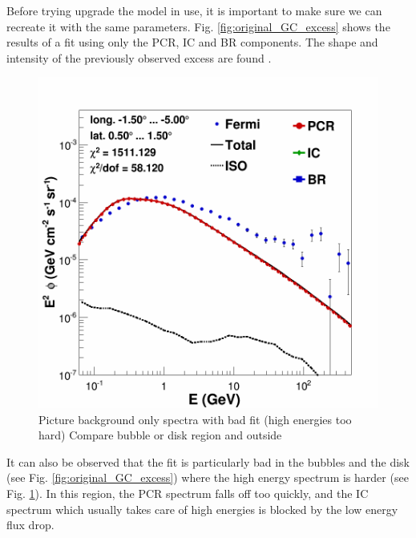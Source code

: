 Before trying upgrade the model in use, it is important to make sure we can recreate it with the same parameters. Fig. \ref{fig:original_GC_excess} shows the results of a fit using only the PCR, IC and BR components. The shape and intensity of the previously observed excess are found .\\

\begin{figure}[h]
  \centering
  \includegraphics[width=.9\linewidth]{pic/results/BKGonly_CMZ.png}
  \caption{Picture background only spectra with bad fit (high energies too hard) Compare bubble or disk region and outside}
  \label{fig:bkgd_only_spectrum}
\end{figure}

It can also be observed that the fit is particularly bad in the bubbles and the disk (see Fig. \ref{fig:original_GC_excess}) where the high energy spectrum is harder (see Fig. \ref{fig:bkgd_only_spectrum}). In this region, the PCR spectrum falls off too quickly, and the IC spectrum which usually takes care of high energies is blocked by the low energy flux drop.




